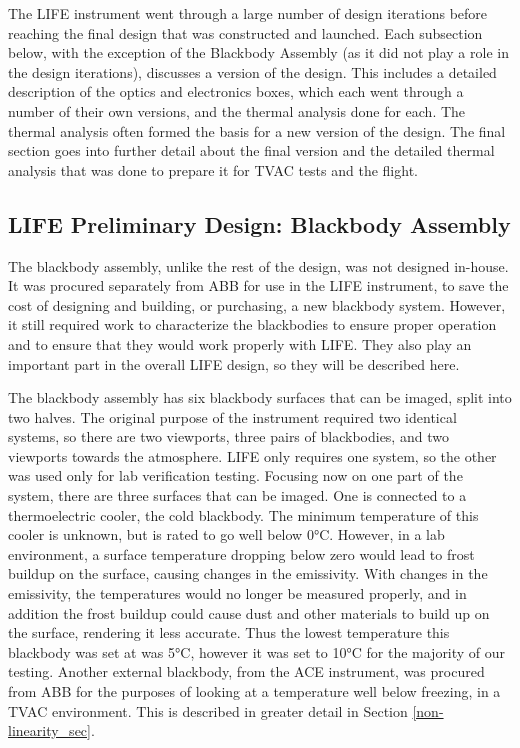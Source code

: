 The LIFE instrument went through a large number of design iterations before reaching the final design that was constructed and launched. Each subsection below, with the exception of the Blackbody Assembly (as it did not play a role in the design iterations), discusses a version of the design. This includes a detailed description of the optics and electronics boxes, which each went through a number of their own versions, and the thermal analysis done for each. The thermal analysis often formed the basis for a new version of the design. The final section goes into further detail about the final version and the detailed thermal analysis that was done to prepare it for TVAC tests and the flight.

\subsection{LIFE Preliminary Design: Blackbody Assembly}\label{blackbody_assem_sec}
The blackbody assembly, unlike the rest of the design, was not designed in-house. It was procured separately from ABB for use in the LIFE instrument, to save the cost of designing and building, or purchasing, a new blackbody system. However, it still required work to characterize the blackbodies to ensure proper operation and to ensure that they would work properly with LIFE. They also play an important part in the overall LIFE design, so they will be described here.

The blackbody assembly has six blackbody surfaces that can be imaged, split into two halves. The original purpose of the instrument required two identical systems, so there are two viewports, three pairs of blackbodies, and two viewports towards the atmosphere. LIFE only requires one system, so the other was used only for lab verification testing. Focusing now on one part of the system, there are three surfaces that can be imaged. One is connected to a thermoelectric cooler, the cold blackbody. The minimum temperature of this cooler is unknown, but is rated to go well below 0°C. However, in a lab environment, a surface temperature dropping below zero would lead to frost buildup on the surface, causing changes in the emissivity. With changes in the emissivity, the temperatures would no longer be measured properly, and in addition the frost buildup could cause dust and other materials to build up on the surface, rendering it less accurate. Thus the lowest temperature this blackbody was set at was 5°C, however it was set to 10°C for the majority of our testing. Another external blackbody, from the ACE instrument, was procured from ABB for the purposes of looking at a temperature well below freezing, in a TVAC environment. This is described in greater detail in Section \ref{non-linearity_sec}. 

